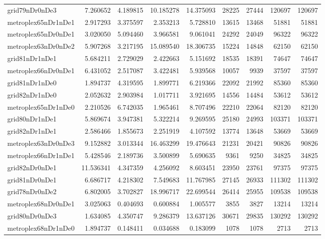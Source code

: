 \begin{longtable}{|l|r|r|r|r|r|r|r|r|}
grid79nDr0nDe3 & 7.260652 & 4.189815 & 10.185278 & 14.375093 & 28225 & 27444 & 120697 & 120697 \\
metroplex65nDr1nDe1 & 2.917293 & 3.375597 & 2.353213 & 5.728810 & 13615 & 13468 & 51881 & 51881 \\
metroplex65nDr0nDe1 & 3.020050 & 5.094460 & 3.966581 & 9.061041 & 24292 & 24049 & 96322 & 96322 \\
metroplex63nDr0nDe2 & 5.907268 & 3.217195 & 15.089540 & 18.306735 & 15224 & 14848 & 62150 & 62150 \\
grid81nDr1nDe1 & 5.684211 & 2.729029 & 2.422663 & 5.151692 & 18535 & 18391 & 74647 & 74647 \\
metroplex66nDr0nDe1 & 6.431052 & 2.517087 & 3.422481 & 5.939568 & 10057 & 9939 & 37597 & 37597 \\
grid81nDr1nDe0 & 1.894737 & 4.319595 & 1.899771 & 6.219366 & 22092 & 21992 & 85360 & 85360 \\
grid82nDr1nDe0 & 2.052632 & 2.903984 & 1.017711 & 3.921695 & 14556 & 14484 & 53612 & 53612 \\
metroplex65nDr1nDe0 & 2.210526 & 6.742035 & 1.965461 & 8.707496 & 22210 & 22064 & 82120 & 82120 \\
grid80nDr1nDe1 & 5.869674 & 3.947381 & 5.322214 & 9.269595 & 25180 & 24993 & 103371 & 103371 \\
grid82nDr1nDe1 & 2.586466 & 1.855673 & 2.251919 & 4.107592 & 13774 & 13648 & 53669 & 53669 \\
metroplex63nDr0nDe3 & 9.152882 & 3.013344 & 16.463299 & 19.476643 & 21231 & 20421 & 90826 & 90826 \\
metroplex66nDr1nDe1 & 5.428546 & 2.189736 & 3.500899 & 5.690635 & 9361 & 9250 & 34825 & 34825 \\
grid82nDr0nDe1 & 11.536341 & 4.347359 & 4.256092 & 8.603451 & 23950 & 23761 & 97375 & 97375 \\
grid81nDr0nDe1 & 6.686717 & 4.218302 & 7.549683 & 11.767985 & 27145 & 26933 & 111302 & 111302 \\
grid78nDr0nDe2 & 6.802005 & 3.702827 & 18.996717 & 22.699544 & 26414 & 25955 & 109538 & 109538 \\
metroplex68nDr0nDe1 & 3.025063 & 0.404693 & 0.600884 & 1.005577 & 3855 & 3827 & 13214 & 13214 \\
grid80nDr0nDe3 & 1.634085 & 4.350747 & 9.286379 & 13.637126 & 30671 & 29835 & 130292 & 130292 \\
metroplex68nDr1nDe0 & 1.894737 & 0.148411 & 0.034688 & 0.183099 & 1078 & 1078 & 2713 & 2713 \\

\end{longtable}
